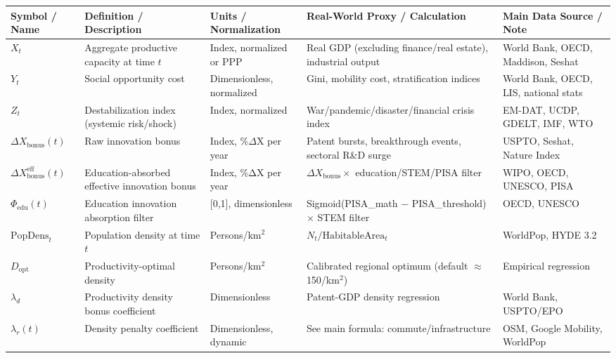 \documentclass[12pt]{report}
\begin{document}
\scriptsize
\setlength\LTleft{0pt}
\setlength\LTright{0pt}

\begin{longtable}{|p{2.8cm}|p{4.3cm}|p{2.0cm}|p{3.0cm}|p{3.0cm}|}
\hline
\textbf{Symbol / Name} & \textbf{Definition / Description} & \textbf{Units / Normalization} & \textbf{Real-World Proxy / Calculation} & \textbf{Main Data Source / Note} \\
\hline
\endfirsthead

$X_t$ & Aggregate productive capacity at time $t$ & Index, normalized or PPP & Real GDP (excluding finance/real estate), industrial output & World Bank, OECD, Maddison, Seshat \\
$Y_t$ & Social opportunity cost & Dimensionless, normalized & Gini, mobility cost, stratification indices & World Bank, OECD, LIS, national stats \\
$Z_t$ & Destabilization index (systemic risk/shock) & Index, normalized & War\slash pandemic\slash disaster\slash financial crisis index & EM-DAT, UCDP, GDELT, IMF, WTO \\
$\Delta X_{\text{bonus}}(t)$ & Raw innovation bonus & Index, \%$\Delta$X per year & Patent bursts, breakthrough events, sectoral R\&D surge & USPTO, Seshat, Nature Index \\
$\Delta X_{\text{bonus}}^{\text{eff}}(t)$ & Education-absorbed effective innovation bonus & Index, \%ΔX per year & $\Delta X_{\text{bonus}} \times$ education/STEM/PISA filter & WIPO, OECD, UNESCO, PISA \\
$\Phi_{\text{edu}}(t)$ & Education innovation absorption filter & [0,1], dimensionless & Sigmoid(PISA\_math $-$ PISA\_threshold) $\times$ STEM filter & OECD, UNESCO \\
$\text{PopDens}_t$ & Population density at time $t$ & Persons/km$^2$ & $N_t / \text{HabitableArea}_t$ & WorldPop, HYDE 3.2 \\
$D_{\text{opt}}$ & Productivity-optimal density & Persons/km$^2$ & Calibrated regional optimum (default $\approx$ 150/km$^2$) & Empirical regression \\
$\lambda_d$ & Productivity density bonus coefficient & Dimensionless & Patent-GDP density regression & World Bank, USPTO/EPO \\
$\lambda_r(t)$ & Density penalty coefficient & Dimensionless, dynamic & See main formula: commute/infrastructure & OSM, Google Mobility, WorldPop \\

\end{longtable}
\end{document}
